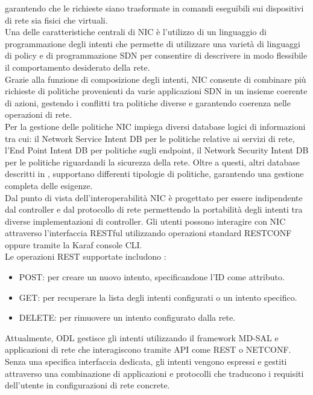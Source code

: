 garantendo che le richieste siano trasformate in comandi eseguibili sui dispositivi di rete sia fisici che virtuali.
\\Una delle caratteristiche centrali di NIC è l'utilizzo di un linguaggio di programmazione degli intenti che permette di utilizzare una varietà di linguaggi di policy e di programmazione SDN
per consentire di descrivere in modo flessibile il comportamento desiderato della rete. %
\\Grazie alla funzione di composizione degli intenti, NIC consente di combinare più richieste di politiche provenienti da varie applicazioni SDN in un insieme coerente di azioni,
gestendo i conflitti tra politiche diverse e garantendo coerenza nelle operazioni di rete.
\\Per la gestione delle politiche NIC impiega diversi database logici di informazioni tra cui: il Network Service Intent DB per le politiche relative ai servizi di rete,
l'End Point Intent DB per politiche sugli endpoint, il Network Security Intent DB per le politiche riguardandi la sicurezza della rete.
Oltre a questi, altri database descritti in \cite{NICProposal}, supportano differenti tipologie di politiche, garantendo una gestione completa delle esigenze.
\\Dal punto di vista dell'interoperabilità NIC è progettato per essere indipendente dal controller e dal protocollo di rete 
permettendo la portabilità degli intenti tra diverse implementazioni di controller.
Gli utenti possono interagire con NIC attraverso l'interfaccia RESTful utilizzando operazioni standard RESTCONF oppure tramite la Karaf console CLI.
\\Le operazioni REST supportate includono \cite{nic}:
\begin{itemize}
    \item POST: per creare un nuovo intento, specificandone l'ID come attributo.
    \item GET: per recuperare la lista degli intenti configurati o un intento specifico.
    \item DELETE: per rimuovere un intento configurato dalla rete.
\end{itemize}
Attualmente, ODL gestisce gli intenti utilizzando il framework MD-SAL e applicazioni di rete che interagiscono tramite API come REST o NETCONF.
\\Senza una specifica interfaccia dedicata, gli intenti vengono espressi e gestiti attraverso una combinazione di applicazioni e protocolli che traducono i requisiti dell'utente in configurazioni di rete concrete.

